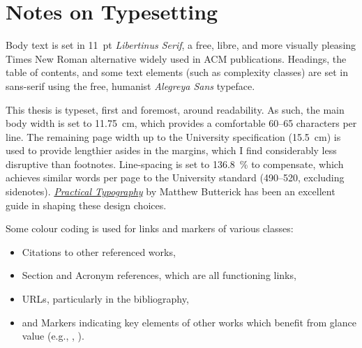 \chapter*{Notes on Typesetting}

Body text is set in \qty{11}{pt} \emph{Libertinus Serif}, a free, libre, and more visually pleasing Times New Roman alternative widely used in ACM publications.
Headings, the table of contents, and some text elements (such as complexity classes) are set in sans-serif using the free, humanist \emph{Alegreya Sans} typeface.

This thesis is typeset, first and foremost, around readability.
As such, the main body width is set to \qty{11.75}{\centi\metre}, which provides a comfortable \numrange{60}{65} characters per line.
The remaining page width up to the University specification (\qty{15.5}{\centi\metre}) is used to provide lengthier asides in the margins, which I find considerably less disruptive than footnotes.
Line-spacing is set to \qty{136.8}{\percent} to compensate, which achieves similar words per page to the University standard (\numrange{490}{520}, excluding sidenotes).
\emph{\href{https://practicaltypography.com/}{Practical Typography}} by Matthew Butterick has been an excellent guide in shaping these design choices.

Some colour coding is used for links and markers of various classes:
\begin{itemize}
	\item {\color{kthesis-cite}Citations} to other referenced works,
	\item {\color{kthesis-internal}Section and Acronym} references, which are all functioning links,
	\item {\color{kthesis-url}URLs}, particularly in the bibliography,
	\item and {\color{kthesis-glance}Markers} indicating key elements of other works which benefit from glance value (e.g., \rllitstate, \rllitact).
\end{itemize}